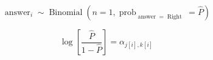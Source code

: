 \documentclass{article}
\begin{document}

\begin{equation}
  \operatorname{answer}_{i}  \sim \operatorname{Binomial}(n = 1, \operatorname{prob}_{\operatorname{answer} = \operatorname{Right}} = \widehat{P})
\end{equation}

\begin{equation}
    \log\left[\frac{\hat{P}}{1 - \hat{P}} \right] =\alpha_{j[i],k[i]}
\end{equation}
\end{document}
